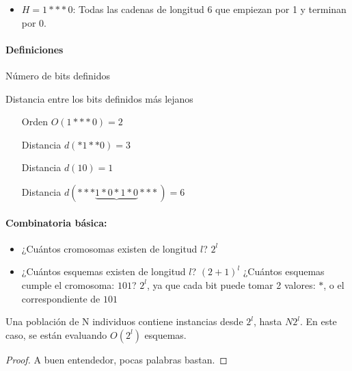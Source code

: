 \documentclass{apuntes}
\begin{document}
\begin{example}
\begin{itemize}
	\item $H = 1***0$: Todas las cadenas de longitud 6 que empiezan por 1 y terminan por 0.
\end{itemize}

\paragraph{Definiciones}



\begin{defn}
Número de bits definidos
\end{defn}

\begin{defn}
Distancia entre los bits definidos más lejanos
\end{defn}
\begin{example}
\begin{itemize}
	\item[Orden] $O(1***0) = 2$
	\item[Distancia] $d(*1**0) = 3$
	\item[Distancia] $d(10) = 1$
	\item[Distancia] $d(***\underbrace{1*0*1*0}_{}***) = 6$
\end{itemize}
\end{example}
\end{example}

\paragraph{Combinatoria básica:}

\begin{itemize}
	\item ¿Cuántos cromosomas existen de longitud $l$? $2^l$
	\item ¿Cuántos esquemas existen de longitud $l$? $(2+1)^l$
	\subitem ¿Cuántos esquemas cumple el cromosoma: $101$? $2^l$, ya que cada bit puede tomar 2 valores: $*$, o el correspondiente de $101$
\end{itemize}


\begin{prop}
 Una población de N individuos contiene instancias desde $2^l$, hasta $N2^l$. En este caso, se están evaluando $O(2^l)$ esquemas.
\end{prop}
\begin{proof}
A buen entendedor, pocas palabras bastan.
\end{proof}
\end{document}
